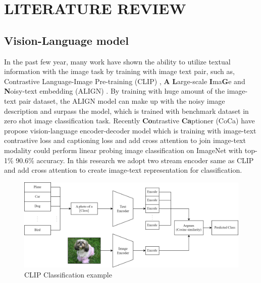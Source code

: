 \chapter{LITERATURE REVIEW}

\section{Vision-Language model}
In the past few year, many work have shown the ability to utilize textual information with the image task by training with image text pair, such as, Contrastive Language-Image Pre-training (CLIP) , \textbf{A} \textbf{L}arge-scale \textbf{I}ma\textbf{G}e and \textbf{N}oisy-text embedding (ALIGN) .
By training with huge amount of the image-text pair dataset, the ALIGN model can make up with the noisy image description and surpass the model, which is trained with benchmark dataset in zero shot image classification task.
Recently \textbf{Co}ntrastive \textbf{Ca}ptioner (CoCa)  have propose vision-language encoder-decoder model which is training with image-text contrastive loss and captioning loss and add cross attention to join image-text modality could perform linear probing image classification on ImageNet with top-1\% 90.6\% accuracy.
In this research we adopt two stream encoder same as CLIP and add cross attention to create image-text representation for classification.

\begin{figure}[h]
    \caption{CLIP Classification example}
    \label{fig:clip_classification}
    \centering
    \includegraphics[width=1\textwidth]{Images/CLIPClassification.png}
    \small
\end{figure}

